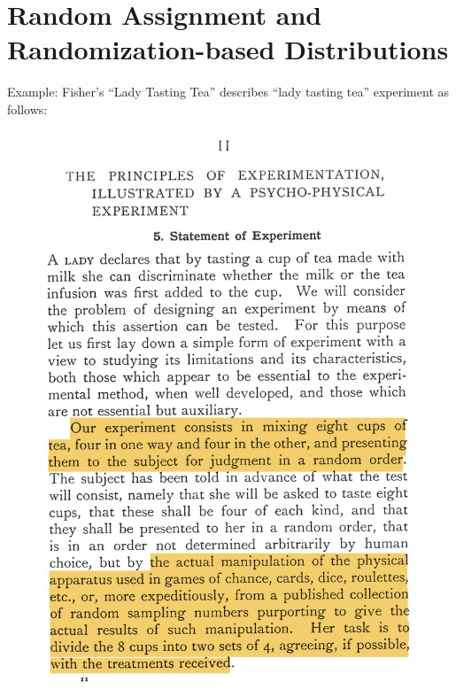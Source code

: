 \documentclass[table, xcolor = {dvipsnames}, 9pt]{beamer}
\theoremstyle{plain}
\begin{document}
\section{Random Assignment and Randomization-based Distributions}
\begin{frame}{Example: Fisher's ``Lady Tasting Tea''}
\vfill
\citet[][p.~11]{fisher1935a} describes ``lady tasting tea'' experiment as follows:
\vspace{-1em}
\begin{figure}[H]
\includegraphics[width=0.5\linewidth]{images/fisher_lady_tasting_tea_text.png}
\end{figure} \vfill
\end{frame}
\end{document}
